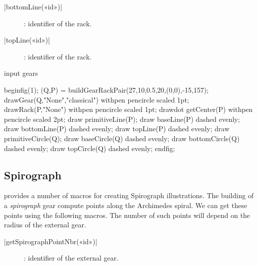 \documentclass[english]{ltxdoc}
\begin{document}
\begin{colourband}
\commande|bottomLine(«id»)|\smallskip{}
\begin{description}
  \item[]:  identifier of the rack. 
\end{description}
\end{colourband}

\begin{colourband}
\commande|topLine(«id»)|\smallskip{}
\begin{description}
  \item[]:  identifier of the rack. 
\end{description}
\end{colourband}

\begin{ExempleMP}
input gears

beginfig(1);
  (Q,P) = buildGearRackPair(27,10,0.5,20,(0,0),-15,157);
  drawGear(Q,"None","classical") withpen pencircle scaled 1pt;
  drawRack(P,"None") withpen pencircle scaled 1pt;
  drawdot getCenter(P) withpen pencircle scaled 2pt;
  draw primitiveLine(P);
  draw baseLine(P) dashed evenly;
  draw bottomLine(P) dashed evenly;
  draw topLine(P) dashed evenly;
  draw primitiveCircle(Q);
  draw baseCircle(Q) dashed evenly;
  draw bottomCircle(Q) dashed evenly;
  draw topCircle(Q) dashed evenly;
endfig;
\end{ExempleMP}

\subsection{Spirograph}\label{sec:spirograph}

\mpgears provides a number of macros for creating Spirograph illustrations. The
building of a \emph{spirograph} gear compute points along the Archimedes spiral.
We can get these points using the following macros. The number of such points
will depend on the radius of the external gear. 

\begin{colourband}
\commande|getSpirographPointNbr(«id»)|\smallskip{}
\begin{description}
  \item[]:  identifier of the external gear. 
\end{description}
\end{colourband}
\end{document}
